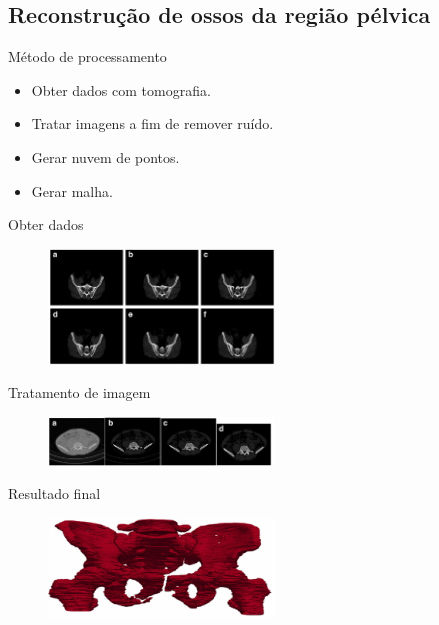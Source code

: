 \documentclass{beamer}
\begin{document}
\subsection{Reconstrução de ossos da região pélvica}

\begin{frame}{Método de processamento}
  \begin{itemize}
  \item {
    Obter dados com tomografia.
  }
  \item {
   Tratar imagens a fim de remover ruído.
  }
  \item {
    Gerar nuvem de pontos.
  }
  \item {
   Gerar malha.
  }
  \end{itemize}
\end{frame}

\begin{frame}{Obter dados}
 \begin{figure}[htb]
\label{fig:pelvis_contraste}
\includegraphics[width=6cm]{./img/pelvis_contraste.png}
\centering
\end{figure}
\end{frame}

\begin{frame}{Tratamento de imagem}
\begin{figure}[htb]
\label{fig:pelvis_reconstrucao}
\includegraphics[width=6cm]{./img/pelvis_reconstrucao.png}
\centering
\end{figure}
\end{frame}


\begin{frame}{Resultado final}
\begin{figure}[htb]
\label{fig:pelvis_final}
\includegraphics[width=6cm]{./img/pelvis_final.png}
\centering
\end{figure}
\end{frame}
\end{document}
